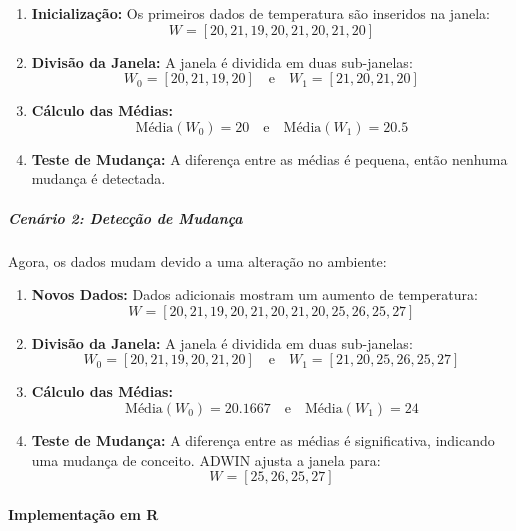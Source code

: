 \documentclass[
]{article}
\providecommand{\tightlist}{%
  \setlength{\itemsep}{0pt}\setlength{\parskip}{0pt}}
\begin{document}
\begin{enumerate}
\def\labelenumi{\arabic{enumi}.}
\tightlist
\item
  \textbf{Inicialização:} Os primeiros dados de temperatura são
  inseridos na janela: \[
  W = [20, 21, 19, 20, 21, 20, 21, 20]
  \]
\item
  \textbf{Divisão da Janela:} A janela é dividida em duas sub-janelas:
  \[
  W_0 = [20, 21, 19, 20] \quad \text{e} \quad W_1 = [21, 20, 21, 20]
  \]
\item
  \textbf{Cálculo das Médias:} \[
  \text{Média}(W_0) = 20 \quad \text{e} \quad \text{Média}(W_1) = 20.5
  \]
\item
  \textbf{Teste de Mudança:} A diferença entre as médias é pequena,
  então nenhuma mudança é detectada.
\end{enumerate}

\hypertarget{cenuxe1rio-2-detecuxe7uxe3o-de-mudanuxe7a}{%
\subparagraph{Cenário 2: Detecção de
Mudança}\label{cenuxe1rio-2-detecuxe7uxe3o-de-mudanuxe7a}}

Agora, os dados mudam devido a uma alteração no ambiente:

\begin{enumerate}
\def\labelenumi{\arabic{enumi}.}
\tightlist
\item
  \textbf{Novos Dados:} Dados adicionais mostram um aumento de
  temperatura: \[
  W = [20, 21, 19, 20, 21, 20, 21, 20, 25, 26, 25, 27]
  \]
\item
  \textbf{Divisão da Janela:} A janela é dividida em duas sub-janelas:
  \[
  W_0 = [20, 21, 19, 20, 21, 20] \quad \text{e} \quad W_1 = [21, 20, 25, 26, 25, 27]
  \]
\item
  \textbf{Cálculo das Médias:} \[
  \text{Média}(W_0) = 20.1667 \quad \text{e} \quad \text{Média}(W_1) = 24
  \]
\item
  \textbf{Teste de Mudança:} A diferença entre as médias é
  significativa, indicando uma mudança de conceito. ADWIN ajusta a
  janela para: \[
  W = [25, 26, 25, 27]
  \]
\end{enumerate}

\hypertarget{implementauxe7uxe3o-em-r}{%
\paragraph{Implementação em R}\label{implementauxe7uxe3o-em-r}}
\end{document}

